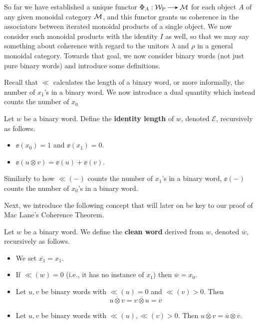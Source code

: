 So far we have established a unique functor $\Phi_A: \wp \to \mm$ 
for each object $A$ of any given monoidal category $\mathcal{M}$,
and this functor grants us coherence in the associators between iterated 
monoidal products of a single object.
We now consider such monoidal products with the identity $I$ as well, 
so that we may say something about coherence with regard to the 
unitors $\lambda$ and $\rho$ in a general monoidal category. 
Towards that goal, we now consider binary words (not just pure binary words)
and introduce some definitions.

Recall that $\ll$ calculates the length of a binary word, or more informally, 
the number of $x_1$'s in a binary word. We now introduce a dual quantity which 
instead counts the number of $x_0$

\begin{definition}
    Let $w$ be a binary word. Define the \textbf{identity length} of $w$, 
    denoted $\mathcal{E}$, recursively as follows. 
    \begin{itemize}
        \item $\ee(x_0) = 1$ and $\ee(x_1) = 0$.
        \item $\ee(u \otimes v) = \ee(u) + \ee(v)$.
    \end{itemize}
\end{definition}

Similarly to how $\ll(-)$ counts the number of $x_1$'s in a binary word, $\ee(-)$ 
counts the number of $x_0$'s in a binary word.

Next, we introduce the following concept that will later on 
be key to our proof of Mac Lane's Coherence Theorem.
\begin{definition}
    Let $w$ be a binary word. 
    We define the \textbf{clean word} derived from $w$,
    denoted $\overline{w}$, recursively as follows. 
    \begin{itemize}
        \item We set $\overline{x_1} = x_1$. 
        \item If $\ll(w) = 0$ (i.e., it has no instance of $x_1$) then $\overline{w} = x_0$. 
        \item Let $u,v$ be binary words with $\ll(u) = 0$ and $\ll(v) > 0$. 
        Then
        \[
            \overline{u \otimes v} = \overline{v \otimes u} = \overline{v}
        \]
        \item Let $u,v$ be binary words with $\ll(u), \ll(v) > 0$. Then 
        $\overline{u\otimes v} =  \overline{u} \otimes \overline{v}$. 
    \end{itemize}
\end{definition}

